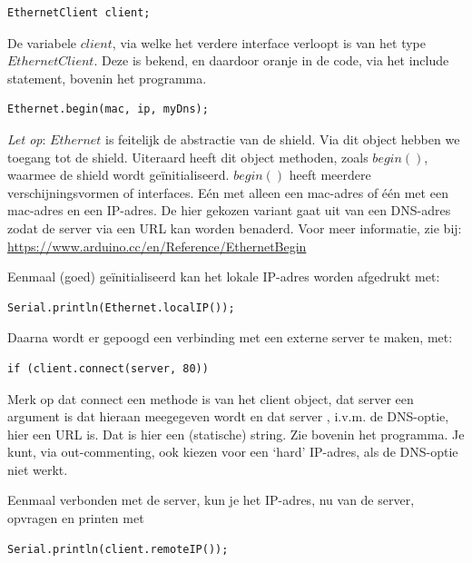 \begin{lstlisting}[language=Arduino, numbers=none]
EthernetClient client;
\end{lstlisting}

De variabele $client$, via welke het verdere interface verloopt is van het type $EthernetClient$. Deze is bekend, en daardoor oranje in de code, via het include statement, bovenin het programma.

\begin{lstlisting}[language=Arduino, numbers=none]
Ethernet.begin(mac, ip, myDns);
\end{lstlisting}

\begin{remark}
\textit{Let op}: $Ethernet$ is feitelijk de abstractie van de shield. Via dit object hebben we toegang tot de shield. Uiteraard heeft dit object methoden, zoals $begin()$, waarmee de shield wordt geïnitialiseerd. $begin()$ heeft meerdere verschijningsvormen of interfaces. Eén met alleen een mac-adres of één met een mac-adres en een IP-adres. De hier gekozen variant gaat uit van een DNS-adres zodat de server via een URL kan worden benaderd. Voor meer informatie, zie bij: \newline
\url{https://www.arduino.cc/en/Reference/EthernetBegin}
\end{remark}

Eenmaal (goed) geïnitialiseerd kan het lokale IP-adres worden afgedrukt met:

\begin{lstlisting}[language=Arduino, numbers=none]
Serial.println(Ethernet.localIP());
\end{lstlisting}

Daarna wordt er gepoogd een verbinding met een externe server te maken, met:
\begin{lstlisting}[language=Arduino, numbers=none]
if (client.connect(server, 80))
\end{lstlisting}
Merk op dat connect een methode is van het client object, dat server een argument is dat hieraan meegegeven wordt en dat server , i.v.m. de DNS-optie, hier een URL is. Dat is hier een (statische) string. Zie bovenin het programma. Je kunt, via out-commenting, ook kiezen voor een ‘hard’ IP-adres, als de DNS-optie niet werkt. \par
Eenmaal verbonden met de server, kun je het IP-adres, nu van de server, opvragen en printen met 
\begin{lstlisting}[language=Arduino, numbers=none]
Serial.println(client.remoteIP());
\end{lstlisting}

